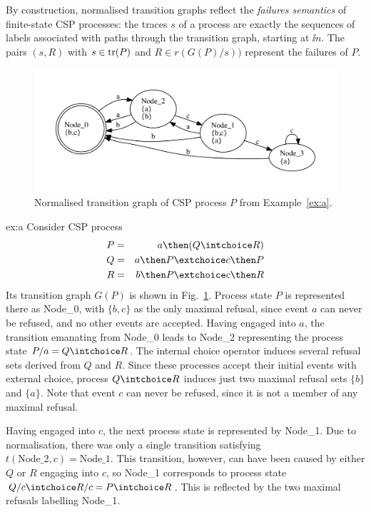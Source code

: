 By construction, normalised transition graphs reflect the \emph{failures semantics} of finite-state CSP processes:
the traces $s$ of a process are exactly the sequences of labels associated
with paths through the transition graph,
starting at $\ii n$. The pairs $(s,R)$ with $s\in\text{tr}(P)$ and
$R\in r(G(P)/s))$ represent the failures of $P$.


 \begin{figure}
 \begin{center}
\includegraphics[width=\textwidth]{q0.pdf}
\end{center}
\caption{Normalised transition graph of CSP process $P$ from Example~\ref{ex:a}.}
 \label{fig:tga}
 \end{figure}



\begin{example}{ex:a}
Consider CSP process
\begin{eqnarray*}
P & = & a \then (Q\intchoice R)
\\
Q & = & a \then P \extchoice c \then P
\\
R & = & b \then P \extchoice c \then R
\end{eqnarray*}
Its transition graph $G(P)$ is shown in Fig.~\ref{fig:tga}. Process state $P$ is represented there as Node\_0, with $\{ b,c\}$ as the only maximal refusal, since event $a$ can never be refused, and no other events are accepted. Having engaged into $a$, the transition emanating from Node\_0 leads to Node\_2 representing  the process state
$P/a = Q\intchoice R$. The internal choice operator induces several refusal sets derived from $Q$ and $R$. Since these processes accept their initial events with external choice,
process $Q\intchoice R$ induces just two maximal refusal sets $\{b\}$ and
$\{a\}$. Note that event $c$ can never be refused, since it is not a member of any
maximal refusal.

Having engaged into $c$, the next process state is represented by Node\_1. Due to normalisation, there was only a single transition satisfying
$t(\text{Node\_2},c) = \text{Node\_1}$. This transition, however, can have been caused
by either $Q$ or $R$ engaging into $c$, so Node\_1 corresponds to process state
$Q/c \intchoice R/c = P \intchoice R$. This is reflected by the two maximal refusals
labelling Node\_1.
\end{example}

